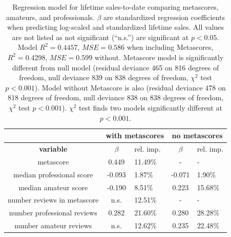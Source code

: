 \documentclass[letterpaper]{article}
\begin{document}
\begin{table}[tb]
\begin{tabularx}{\linewidth}{|c|c|X|c|X|}
\hline  & \multicolumn{2}{|c|}{\textbf{with metascores}} & \multicolumn{2}{|c|}{\textbf{no metascores}}\\ 
\hline \textbf{variable} & \textbf{$\beta$} & rel. imp. & \textbf{$\beta$} & rel. imp.\\ 
\hline metascore & 0.449 & 11.49\% & - & - \\ 
\hline median professional score & -0.093 & 1.87\% & -0.071 & 1.90\% \\ 
\hline median amateur score & -0.190 & 8.51\% & 0.223 & 15.68\% \\ 
\hline number reviews in metascore & n.s. & 12.51\% & - & - \\ 
\hline number professional reviews & 0.282 & 21.60\% & 0.280 & 28.28\% \\ 
\hline number amateur reviews & n.s. & 12.62\% & 0.235 & 22.48\% \\ 
\hline 
\end{tabularx}
\caption{Regression model for lifetime sales-to-date comparing metascores, amateurs, and professionals. $\beta$ are standardized regression coefficients when predicting log-scaled and standardized lifetime sales. All values are not listed as not significant (``n.s.'') are significant at $p < 0.05$. 
Model $R^2 = 0.4457$, $MSE = 0.586$ when including Metascores, $R^2 = 0.4298$, $MSE = 0.599$ without. 
Metascore model is significantly different from null model (residual deviance 465 on 816 degrees of freedom, null deviance 839 on 838 degrees of freedom, $\chi^2$ test $p < 0.001$). Model without Metascore is also (residual deviance 478 on 818 degrees of freedom, null deviance 838 on 838 degrees of freedom, $\chi^2$ test $p < 0.001$). $\chi^2$ test finds two models significantly different at $p < 0.001$.
}
\label{tab:sales_metascore_lm}
\end{table}

\end{document}
